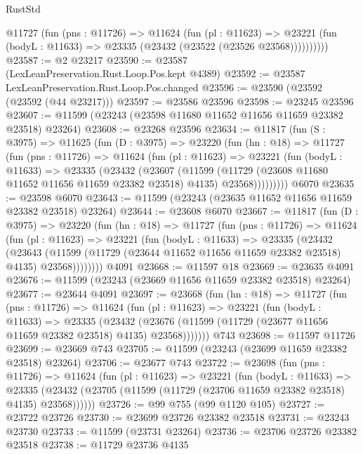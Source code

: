 \begin{lexlean}{RustStd}
\begin{coremodule}
          @11727
            (fun (pns : @11726) =>
            @11624
              (fun (pl : @11623) =>
              @23221 (fun (bodyL : @11633) => @23335 (@23432 (@23522 (@23526 @23568))))))))))
@23587 := @2 @23217
@23590 := @23587 (LexLeanPreservation.Rust.Loop.Pos.kept @4389)
@23592 := @23587 LexLeanPreservation.Rust.Loop.Pos.changed
@23596 := @23590 (@23592 (@23592 (@44 @23217)))
@23597 := @23586 @23596
@23598 := @23245 @23596
@23607 := @11599 (@23243 (@23598 @11680 @11652 @11656 @11659 @23382 @23518) @23264)
@23608 := @23268 @23596
@23634 := @11817
    (fun (S : @3975) =>
    @11625
      (fun (D : @3975) =>
      @23220
        (fun (hn : @18) =>
        @11727
          (fun (pns : @11726) =>
          @11624
            (fun (pl : @11623) =>
            @23221
              (fun (bodyL : @11633) =>
              @23335
                (@23432
                  (@23607
                    (@11599
                      (@11729 (@23608 @11680 @11652 @11656 @11659 @23382 @23518) @4135)
                      @23568)))))))))
    @6070
@23635 := @23598 @6070
@23643 := @11599 (@23243 (@23635 @11652 @11656 @11659 @23382 @23518) @23264)
@23644 := @23608 @6070
@23667 := @11817
    (fun (D : @3975) =>
    @23220
      (fun (hn : @18) =>
      @11727
        (fun (pns : @11726) =>
        @11624
          (fun (pl : @11623) =>
          @23221
            (fun (bodyL : @11633) =>
            @23335
              (@23432
                (@23643
                  (@11599 (@11729 (@23644 @11652 @11656 @11659 @23382 @23518) @4135) @23568))))))))
    @4091
@23668 := @11597 @18
@23669 := @23635 @4091
@23676 := @11599 (@23243 (@23669 @11656 @11659 @23382 @23518) @23264)
@23677 := @23644 @4091
@23697 := @23668
    (fun (hn : @18) =>
    @11727
      (fun (pns : @11726) =>
      @11624
        (fun (pl : @11623) =>
        @23221
          (fun (bodyL : @11633) =>
          @23335
            (@23432
              (@23676 (@11599 (@11729 (@23677 @11656 @11659 @23382 @23518) @4135) @23568)))))))
    @743
@23698 := @11597 @11726
@23699 := @23669 @743
@23705 := @11599 (@23243 (@23699 @11659 @23382 @23518) @23264)
@23706 := @23677 @743
@23722 := @23698
    (fun (pns : @11726) =>
    @11624
      (fun (pl : @11623) =>
      @23221
        (fun (bodyL : @11633) =>
        @23335 (@23432 (@23705 (@11599 (@11729 (@23706 @11659 @23382 @23518) @4135) @23568))))))
@23726 := @99 @755 (@99 @1120 @105)
@23727 := @23722 @23726
@23730 := @23699 @23726 @23382 @23518
@23731 := @23243 @23730
@23733 := @11599 (@23731 @23264)
@23736 := @23706 @23726 @23382 @23518
@23738 := @11729 @23736 @4135

\end{coremodule}
\end{lexlean}
